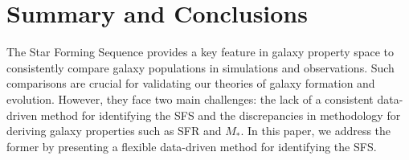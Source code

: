 \documentclass[tighten, preprint]{aastex62}
\newcommand{\todo}[1]{{\bf \textcolor{red}{ #1}}}
\begin{document}


\section{Summary and Conclusions} \label{sec:summary}
{\color{red} 
The Star Forming Sequence provides a key feature in galaxy property 
space to consistently compare %
galaxy populations in simulations and observations.}
Such comparisons are crucial for validating our theories of
galaxy formation and evolution. However, they face two main challenges: 
the lack of a consistent data-driven method for identifying the SFS and 
the discrepancies in methodology for deriving galaxy properties such as 
SFR and $M_*$. In this paper, we address the former by presenting 
a flexible data-driven method for identifying the SFS. 
\end{document}
